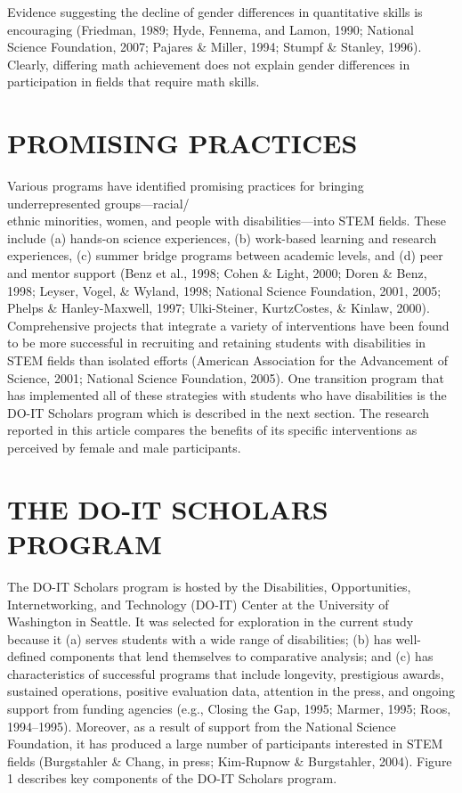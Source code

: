 \documentclass[11.5pt]{sig-alternate} %
\begin{document}
\begin{large}
Evidence suggesting the decline of gender differences in quantitative skills is encouraging (Friedman, 1989; Hyde, Fennema, and Lamon, 1990; National Science Foundation, 2007; Pajares \& Miller, 1994; Stumpf \& Stanley, 1996). Clearly, differing math achievement does not explain gender differences in participation in fields that require math skills.  
 
\section*{PROMISING PRACTICES}
 
Various programs have identified promising practices for bringing underrepresented groups—racial/\\ethnic minorities, women, and people with disabilities—into STEM fields. These include (a) hands-on science experiences, (b) work-based learning and research experiences, (c) summer bridge programs between academic levels, and (d) peer and mentor support (Benz et al., 1998; Cohen \& Light, 2000; Doren \& Benz, 1998; Leyser, Vogel, \& Wyland, 1998; National Science Foundation, 2001, 2005; Phelps \& Hanley-Maxwell, 1997; Ulki-Steiner, KurtzCostes, \& Kinlaw, 2000). Comprehensive projects that integrate a variety of interventions have been found to be more successful in recruiting and retaining students with disabilities in STEM fields than isolated efforts (American Association for the Advancement of Science, 2001; National Science Foundation, 2005). One transition program that has implemented all of these strategies with students who have disabilities is the DO-IT Scholars program which is described in the next section. The research reported in this article compares the benefits of its specific interventions as perceived by female and male participants. 
 
\section*{THE DO-IT SCHOLARS PROGRAM}
 
The DO-IT Scholars program is hosted by the Disabilities, Opportunities, Internetworking, and Technology (DO-IT) Center at the University of Washington in Seattle. It was selected for exploration in the current study because it (a) serves students with a wide range of disabilities; (b) has well-defined components that lend themselves to comparative analysis; and (c) has characteristics of successful programs that include longevity, prestigious awards, sustained operations, positive evaluation data, attention in the press, and ongoing support from funding agencies (e.g., Closing the Gap, 1995; Marmer, 1995; Roos, 1994–1995). Moreover, as a result of support from the National Science Foundation, it has produced a large number of participants interested in STEM fields (Burgstahler \& Chang, in press; Kim-Rupnow \& Burgstahler, 2004). Figure 1 describes key components of the DO-IT Scholars program. 


\end{large}
\end{document}
